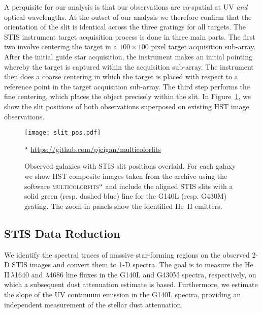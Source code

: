 \documentclass[linenumbers]{aastex63}
\begin{document}
A perquisite for our analysis is that our observations are co-spatial at UV {\it and} optical wavelengths. At the outset of our analysis we therefore confirm that the orientation of the slit is identical across the three gratings for all targets. The STIS instrument target acquisition process is done in three main parts. The first two involve centering the target in a $100 \times 100$ pixel target acquisition sub-array. After the initial guide star acquisition, the instrument makes an initial pointing whereby the target is captured within the acquisition sub-array. The instrument then does a coarse centering in which the target is placed with respect to a reference point in the target acquisition sub-array. The third step performs the fine centering, which places the object precisely within the slit.
In Figure~\ref{fig:slit_alignment}, we show the slit positions of both observations superposed on existing HST image observations.
%
\begin{figure*}[h]
    \centering
    \texttt{[image: slit\_pos.pdf]}
    \caption{Observed galaxies with STIS slit positions overlaid. For each galaxy we show HST composite images taken from the archive using the software  \textsc{multicolorfits}$^{\rm a}$ and include the aligned STIS slits with a solid green (resp. dashed blue) line for the G140L (resp. G430M) grating. The zoom-in panels show the identified He~II emitters.} 
    \label{fig:slit_alignment}
    \begin{tablenotes}
    \item $^{\rm a}$ \url{https://github.com/pjcigan/multicolorfits}
    \end{tablenotes}
\end{figure*}
%

\subsection{STIS Data Reduction}\label{sec:stis_data_reduction}
We identify the spectral traces of massive star-forming regions on the observed 2-D STIS images and convert them to 1-D spectra. The goal is to measure the He\,II\,$\lambda$1640 and $\lambda$4686 line fluxes in the G140L and G430M spectra, respectively, on which a subsequent dust attenuation estimate is based. Furthermore, we estimate the slope of the UV continuum emission in the G140L spectra, providing an independent measurement of the stellar dust attenuation. 
\end{document}

